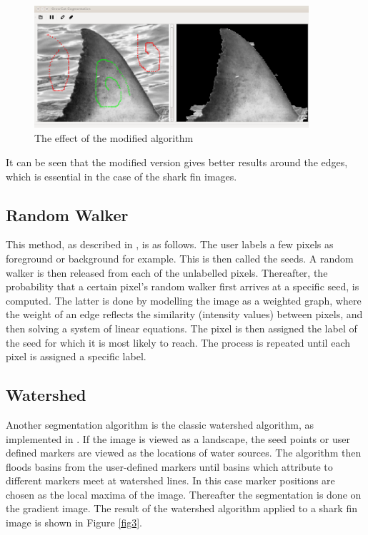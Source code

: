 \documentclass[a4paper,10pt]{article}
\begin{document}
\begin{figure}[H]
 \centering
 \includegraphics[width=4in, height=1.8in]{haaim}
 \caption{The effect of the modified algorithm}
 \label{fin2}
\end{figure}

\noindent It can be seen that the modified version gives better results around
the edges, which is essential in the case of the shark fin images. \\  


\subsection{Random Walker}
This method, as
described in \cite{rw}, is as follows.  The user labels a few
pixels as foreground or background for example.  This is then called the seeds. 
A random walker is then released from each of the unlabelled pixels. 
Thereafter, the probability that a certain pixel's random walker first arrives
at a specific seed, is computed.  The latter is done by modelling the image as a weighted graph, where
the weight of an edge reflects the similarity (intensity values) between pixels,
and then solving a system of linear equations.  The pixel is then assigned the
label
of the seed for which it is most likely to reach.  The process is repeated until
each pixel is assigned a specific label.


\subsection{Watershed}
\label{watershed}
Another segmentation algorithm is the classic watershed algorithm, as
implemented in \cite{scikit}.  If the image is viewed
  as a landscape, the seed points or user defined markers are viewed as the locations of water sources.  The algorithm then floods
basins from the user-defined markers until basins which attribute to different
markers meet at watershed lines.  In this case marker positions are chosen as
the local maxima of the image.  Thereafter the segmentation is done on the
gradient image.  The result of the watershed algorithm applied to a shark fin
image is shown in Figure \ref{fig3}.
\end{document}
